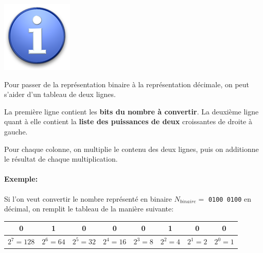 \documentclass{article}
\begin{document}
\begin{minipage}[b]{.08\linewidth}
	\includegraphics[width=\linewidth]{./figures/info.png}
	\vspace{1em}
\end{minipage}
\hfill
\begin{minipage}[b]{.85\linewidth}
	Pour passer de la représentation binaire à la représentation décimale, 
	on peut s'aider d'un tableau de deux lignes.

	La première ligne contient les \textbf{bits du nombre à convertir}. La deuxième ligne quant à elle contient la \textbf{liste des puissances de deux} croissantes de droite à gauche.

	Pour chaque colonne, on multiplie le contenu des deux lignes, puis on additionne le résultat de chaque multiplication.
\end{minipage}

\paragraph{Exemple:} 
Si l'on veut convertir le nombre représenté en binaire $N_{binaire} =$ \texttt{0100 0100} en décimal, on remplit le tableau de la manière suivante:

\begin{center}
	\begin{tabular}{|c|c|c|c|c|c|c|c|}
		\hline
		0 & 1 & 0 & 0 & 0 & 1 & 0 & 0 \\
		\hline
		$2^7 = 128$ & $2^6 = 64$ & $2^5 = 32$ & $2^4 = 16$ & $2^3 = 8$ & $2^2 = 4$ & $2^1 = 2$ & $2^0 = 1$ \\
		\hline
	\end{tabular}
\end{center}
\end{document}
